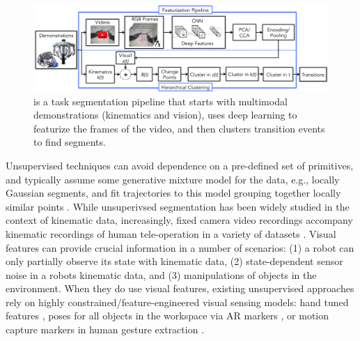 \documentclass[0-main.tex]{subfiles}
\begin{document}
\begin{figure}
    \centering
    \vspace{-10pt}
    \includegraphics[width=1.5\linewidth]{figures/sysArch}
    \caption{\tsc is a task segmentation pipeline that starts with multimodal demonstrations (kinematics and vision), uses deep learning to featurize the frames of the video, and then clusters transition events to find segments.}
    \label{fig:pipeline}
    \vspace{-10pt}
\end{figure}


Unsupervised techniques can avoid dependence on a pre-defined set of primitives, and typically assume some generative mixture model for the data, e.g., locally Gaussian segments, and fit trajectories to this model grouping together locally similar points \cite{calinon2010learning, krishnan2015tsc, calinon2004stochastic, kruger2010learning, fox2009nonparametric, oh2005learning}.
While unsuperivsed segmentation has been widely studied in the context of kinematic data, increasingly, fixed camera video recordings accompany kinematic recordings of human tele-operation in a variety of datasets \cite{hodgins2009guide, gao2014jigsaws, ofli2013berkeley}.
Visual features can provide crucial information in a number of scenarios: (1) a robot can only partially observe its state with kinematic data, (2) state-dependent sensor noise in a robots kinematic data, and (3) manipulations of objects in the environment.
When they do use visual features, existing unsupervised approaches rely on highly constrained/feature-engineered visual sensing models: hand tuned features \cite{krishnan2015tsc}, poses for all objects in the workspace via AR markers \cite{Niekum2015learning}, or motion capture markers in human gesture extraction \cite{kulic2011incremental}.
\end{document}
